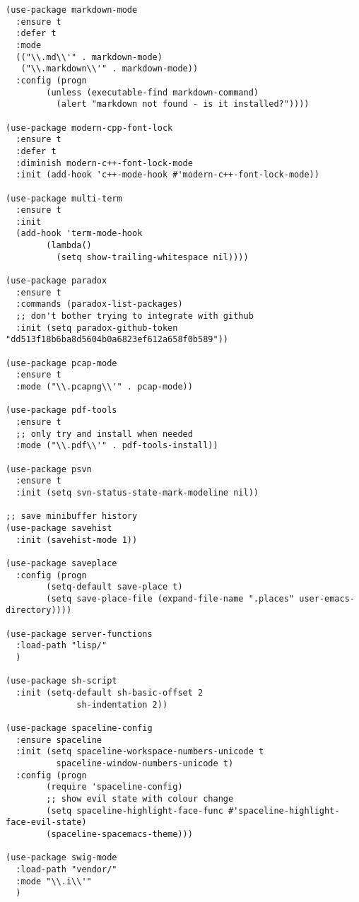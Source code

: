 \documentclass[11pt]{article}
\begin{document}
\begin{verbatim}
(use-package markdown-mode
  :ensure t
  :defer t
  :mode
  (("\\.md\\'" . markdown-mode)
   ("\\.markdown\\'" . markdown-mode))
  :config (progn
	    (unless (executable-find markdown-command)
	      (alert "markdown not found - is it installed?"))))

(use-package modern-cpp-font-lock
  :ensure t
  :defer t
  :diminish modern-c++-font-lock-mode
  :init (add-hook 'c++-mode-hook #'modern-c++-font-lock-mode))

(use-package multi-term
  :ensure t
  :init
  (add-hook 'term-mode-hook
	    (lambda()
	      (setq show-trailing-whitespace nil))))

(use-package paradox
  :ensure t
  :commands (paradox-list-packages)
  ;; don't bother trying to integrate with github
  :init (setq paradox-github-token "dd513f18b6ba8d5604b0a6823ef612a658f0b589"))

(use-package pcap-mode
  :ensure t
  :mode ("\\.pcapng\\'" . pcap-mode))

(use-package pdf-tools
  :ensure t
  ;; only try and install when needed
  :mode ("\\.pdf\\'" . pdf-tools-install))

(use-package psvn
  :ensure t
  :init (setq svn-status-state-mark-modeline nil))

;; save minibuffer history
(use-package savehist
  :init (savehist-mode 1))

(use-package saveplace
  :config (progn
	    (setq-default save-place t)
	    (setq save-place-file (expand-file-name ".places" user-emacs-directory))))

(use-package server-functions
  :load-path "lisp/"
  )

(use-package sh-script
  :init (setq-default sh-basic-offset 2
		      sh-indentation 2))

(use-package spaceline-config
  :ensure spaceline
  :init (setq spaceline-workspace-numbers-unicode t
	      spaceline-window-numbers-unicode t)
  :config (progn
	    (require 'spaceline-config)
	    ;; show evil state with colour change
	    (setq spaceline-highlight-face-func #'spaceline-highlight-face-evil-state)
	    (spaceline-spacemacs-theme)))

(use-package swig-mode
  :load-path "vendor/"
  :mode "\\.i\\'"
  )


\end{verbatim}
\end{document}
